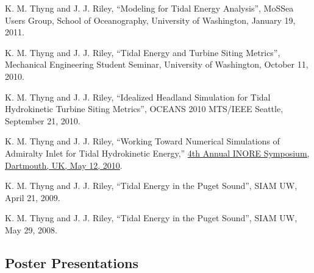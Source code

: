 \documentclass[10pt,letterpaper]{article}
\renewenvironment{itemize}{
  \begin{list}{}{
    \setlength{\leftmargin}{1.5em}
    \setlength{\itemsep}{0.25em}
    \setlength{\parskip}{0pt}
    \setlength{\parsep}{0.25em}
  }
}{
  \end{list}
}
\begin{document}
\begin{itemize}
\item K. M. Thyng and J. J. Riley, ``Modeling for Tidal Energy Analysis'', MoSSea Users Group, School of Oceanography, University of Washington, January 19, 2011.

\item K. M. Thyng and J. J. Riley, ``Tidal Energy and Turbine Siting Metrics'', Mechanical Engineering Student Seminar, University of Washington, October 11, 2010.

\item K. M. Thyng and J. J. Riley, ``Idealized Headland Simulation for Tidal Hydrokinetic Turbine Siting Metrics'', OCEANS 2010 MTS/IEEE Seattle, September 21, 2010.

\item K. M. Thyng and J. J. Riley, ``Working Toward Numerical Simulations of Admiralty Inlet for Tidal Hydrokinetic Energy,'' \href{http://inore.org/}{4th Annual INORE Symposium, Dartmouth, UK, May 12, 2010}.

\item K. M. Thyng and J. J. Riley, ``Tidal Energy in the Puget Sound'', SIAM UW, April 21, 2009.

\item K. M. Thyng and J. J. Riley, ``Tidal Energy in the Puget Sound'', SIAM UW, May 29, 2008.

%
%

\end{itemize}

\subsection*{Poster Presentations}
\end{document}
